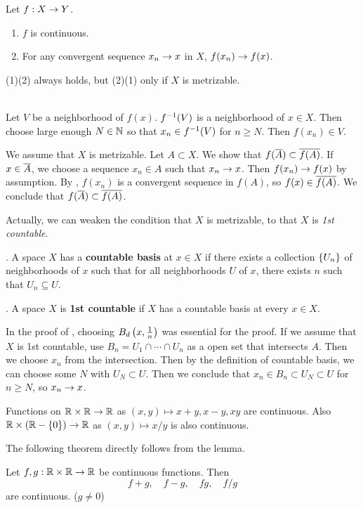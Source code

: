  Let \(f : X \rightarrow Y\).
\begin{enumerate}
    \item \(f\) is continuous.
    \item For any convergent sequence \(x_n \rightarrow x\) in \(X\), \(f(x_n) \rightarrow f(x)\).
\end{enumerate}
(1)\mimp (2) always holds, but (2)\mimp (1) only if \(X\) is metrizable.

\pf \\
\note{\mimp} Let \(V\) be a neighborhood of \(f(x)\). \(f^{-1}(V)\) is a neighborhood of \(x \in X\). Then choose large enough \(N \in \mathbb{N}\) so that \(x_n \in f^{-1}(V)\) for \(n \geq N\). Then \(f(x_n) \in V\).

\note{\mimpd} We assume that \(X\) is metrizable. Let \(A \subset X\). We show that \(f(\overline{A}) \subset \overline{f(A)}\). If \(x \in \overline{A}\), we choose a sequence \(x_n \in A\) such that \(x_n \rightarrow x\). Then \(f(x_n) \rightarrow f(x)\) by assumption. By , \(f(x_n)\) is a convergent sequence in \(f(A)\), so \(f(x) \in \overline{f(A)}\). We conclude that \(f(\overline{A}) \subset \overline{f(A)}\).

Actually, we can weaken the condition that \(X\) is metrizable, to that \(X\) is \textit{1st countable}.

.  A space \(X\) has a \textbf{countable basis} at \(x \in X\) if there exists a collection \(\left\{ U_n \right\}\) of neighborhoods of \(x\) such that for all neighborhoods \(U\) of \(x\), there exists \(n\) such that \(U_n \subseteq U\).

. A space \(X\) is \textbf{1st countable} if \(X\) has a countable basis at every \(x \in X\).

\rmk In the proof of , choosing \(B_d\left( x, \frac{1}{n} \right)\) was essential for the proof. If we assume that \(X\) is 1st countable, use \(B_n = U_1\cap \cdots \cap U_n\) as a open set that intersects \(A\). Then we choose \(x_n\) from the intersection. Then by the definition of countable basis, we can choose some \(N\) with \(U_N \subset U\). Then we conclude that \(x_n \in B_n \subset U_N \subset U\) for \(n \geq N\), so \(x_n \rightarrow x\).

 Functions on \(\mathbb{R} \times \mathbb{R} \rightarrow \mathbb{R}\) as \((x, y) \mapsto x + y, x - y, xy\) are continuous. Also \(\mathbb{R} \times (\mathbb{R} - \{0\}) \rightarrow \mathbb{R}\) as \((x, y) \mapsto x/y\) is also continuous.

The following theorem directly follows from the lemma.

 Let \(f, g : \mathbb{R} \times \mathbb{R} \rightarrow \mathbb{R}\) be continuous functions. Then
\[
    f + g, \quad f - g, \quad fg, \quad f/g
\]
are continuous. (\(g \neq 0\))

